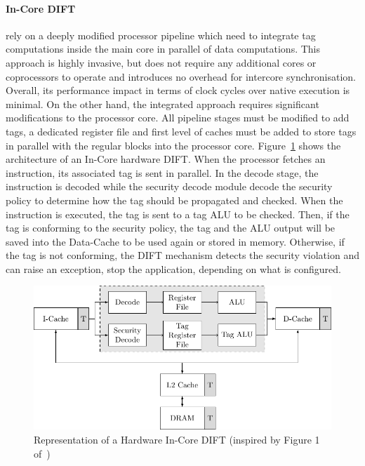 \paragraph{In-Core DIFT} rely on a deeply modified processor pipeline which need to integrate tag computations inside the main core in parallel of data computations. This approach is highly invasive, but does not require any additional cores or coprocessors to operate and introduces no overhead for intercore synchronisation. Overall, its performance impact in terms of clock cycles over native execution is minimal. On the other hand, the integrated approach requires significant modifications to the processor core. All pipeline stages must be modified to add tags, a dedicated register file and first level of caches must be added to store tags in parallel with the regular blocks into the processor core. Figure~\ref{fig:incore_dift} shows the architecture of an In-Core hardware DIFT. When the processor fetches an instruction, its associated tag is sent in parallel. In the decode stage, the instruction is decoded while the security decode module decode the security policy to determine how the tag should be propagated and checked. When the instruction is executed, the tag is sent to a tag ALU to be checked. Then, if the tag is conforming to the security policy, the tag and the ALU output will be saved into the Data-Cache to be used again or stored in memory. Otherwise, if the tag is not conforming, the DIFT mechanism detects the security violation and can raise an exception, stop the application, depending on what is configured.

\begin{figure}[ht]
    \centering
    \includegraphics{c2_soa/img/incore.pdf}
    \caption{Representation of a Hardware In-Core DIFT (inspired by Figure 1 of~\cite{KDK-09-dsn})}
    \label{fig:incore_dift}
\end{figure}

